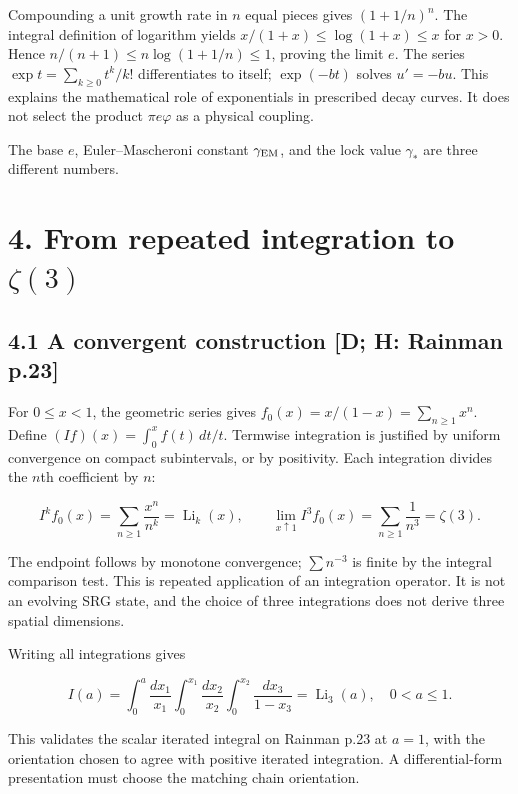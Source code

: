 \documentclass[11pt,a4paper]{article}
\begin{document}
Compounding a unit growth rate in $n$ equal pieces gives $(1+1/n)^n$. The integral definition of logarithm yields
$x/(1+x)\leq\log(1+x)\leq x$ for $x>0$. Hence
$n/(n+1)\leq n\log(1+1/n)\leq1$, proving the limit $e$.
The series $\exp t=\sum_{k\geq0}t^k/k!$ differentiates to itself; $\exp(-bt)$ solves $u'=-bu$. This explains the mathematical role of exponentials in prescribed decay curves. It does not select the product $\pi e\varphi$ as a physical coupling.


The base $e$, Euler--Mascheroni constant $\gamma_{\rm EM}$, and the lock value $\gamma_*$ are three different numbers.


\clearpage
\section*{4. From repeated integration to $\zeta(3)$}

\subsection*{4.1 A convergent construction [D; H: Rainman p.23]}

For $0\leq x<1$, the geometric series gives $f_0(x)=x/(1-x)=\sum_{n\geq1}x^n$. Define
$(If)(x)=\int_0^x f(t)\,dt/t$. Termwise integration is justified by uniform convergence on compact subintervals, or by positivity. Each integration divides the $n$th coefficient by $n$:


\[
I^kf_0(x)=\sum_{n\geq1}\frac{x^n}{n^k}
=\operatorname{Li}_k(x),\qquad
\lim_{x\uparrow1}I^3f_0(x)=\sum_{n\geq1}\frac1{n^3}=\zeta(3). \tag{6}
\]

The endpoint follows by monotone convergence; $\sum n^{-3}$ is finite by the integral comparison test. This is repeated application of an integration operator. It is not an evolving SRG state, and the choice of three integrations does not derive three spatial dimensions.


Writing all integrations gives


\[
I(a)=\int_0^a\frac{dx_1}{x_1}
\int_0^{x_1}\frac{dx_2}{x_2}
\int_0^{x_2}\frac{dx_3}{1-x_3}
=\operatorname{Li}_3(a),\quad0<a\leq1. \tag{7}
\]

This validates the scalar iterated integral on Rainman p.23 at $a=1$, with the orientation chosen to agree with positive iterated integration. A differential-form presentation must choose the matching chain orientation.
\end{document}
